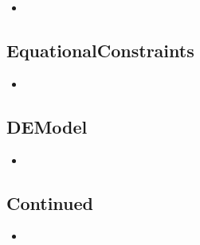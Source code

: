 \begin{itemize}

	\item {}

\end{itemize}

\subsection{EquationalConstraints}

\begin{itemize}

	\item {}

\end{itemize}

\subsection{DEModel}

\begin{itemize}

	\item {}

\end{itemize}

\subsection{Continued}

\begin{itemize}

	\item {}

\end{itemize}
